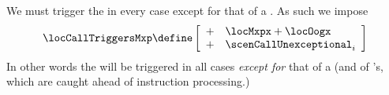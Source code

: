 We must trigger the \mxpMod{} in every case except for that of a \staticxSH{}. As such we impose
\[
	\locCallTriggersMxp
	\define
	\left[ \begin{array}{ll}
		+ & \locMxpx + \locOogx         \\
		+ & \scenCallUnexceptional _{i} \\
	\end{array} \right]
\]
In other words the \mxpMod{} will be triggered in all cases \emph{except for} that of a \staticxSH{} (and of \suxSH{}'s, which are caught ahead of instruction processing.)
